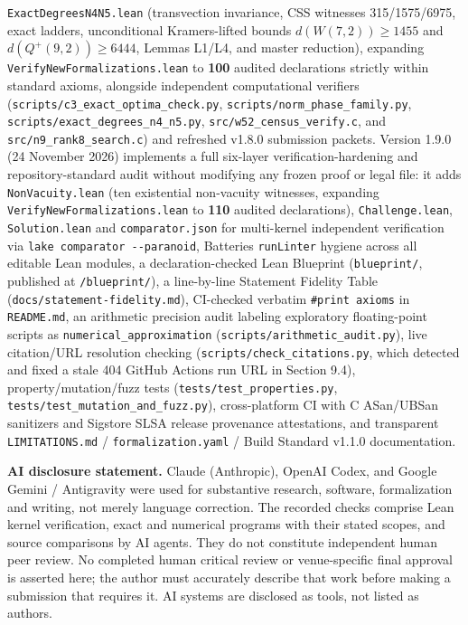 \documentclass[11pt,a4paper]{article}
\begin{document}
\nolinkurl{ExactDegreesN4N5.lean} (transvection invariance, CSS witnesses 315/1575/6975, exact ladders, unconditional
Kramers-lifted bounds \(d(W(7,2))\ge1455\) and \(d(Q^+(9,2))\ge6444\), Lemmas L1/L4, and master reduction),
expanding \nolinkurl{VerifyNewFormalizations.lean} to \textbf{100} audited declarations strictly within standard axioms,
alongside independent computational verifiers (\nolinkurl{scripts/c3_exact_optima_check.py},
\nolinkurl{scripts/norm_phase_family.py}, \nolinkurl{scripts/exact_degrees_n4_n5.py}, \nolinkurl{src/w52_census_verify.c}, and
\nolinkurl{src/n9_rank8_search.c}) and refreshed v1.8.0 submission packets.
Version 1.9.0 (24 November 2026) implements a full six-layer verification-hardening and repository-standard
audit without modifying any frozen proof or legal file: it adds \texttt{NonVacuity.lean} (ten existential
non-vacuity witnesses, expanding \nolinkurl{VerifyNewFormalizations.lean} to \textbf{110} audited declarations),
\texttt{Challenge.lean}, \texttt{Solution.lean} and \texttt{comparator.json} for multi-kernel independent verification via
\texttt{lake\ comparator\ -\/-paranoid}, Batteries \texttt{runLinter} hygiene across all editable Lean modules, a
declaration-checked Lean Blueprint (\texttt{blueprint/}, published at \texttt{/blueprint/}), a line-by-line Statement
Fidelity Table (\nolinkurl{docs/statement-fidelity.md}), CI-checked verbatim \texttt{\#print\ axioms} in \texttt{README.md}, an
arithmetic precision audit labeling exploratory floating-point scripts as \nolinkurl{numerical_approximation}
(\nolinkurl{scripts/arithmetic_audit.py}), live citation/URL resolution checking (\nolinkurl{scripts/check_citations.py},
which detected and fixed a stale 404 GitHub Actions run URL in Section 9.4), property/mutation/fuzz tests
(\nolinkurl{tests/test_properties.py}, \nolinkurl{tests/test_mutation_and_fuzz.py}), cross-platform CI with C ASan/UBSan
sanitizers and Sigstore SLSA release provenance attestations, and transparent \texttt{LIMITATIONS.md} /
\nolinkurl{formalization.yaml} / Build Standard v1.1.0 documentation.

\textbf{AI disclosure statement.} Claude (Anthropic), OpenAI Codex, and Google Gemini / Antigravity were
used for substantive research, software, formalization and writing, not merely language correction. The
recorded checks comprise Lean kernel verification, exact and numerical programs with their stated
scopes, and source comparisons by AI agents. They do not constitute independent human peer review. No
completed human critical review or venue-specific final approval is asserted here; the author must
accurately describe that work before making a submission that requires it. AI systems are disclosed as
tools, not listed as authors.
\end{document}
